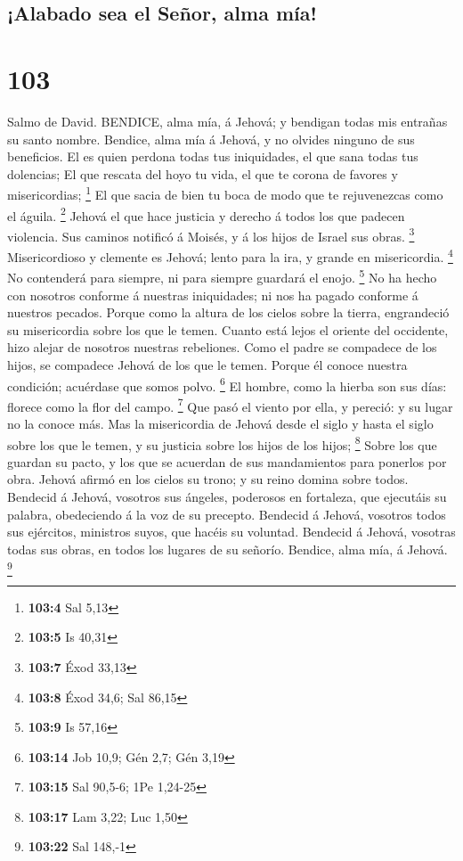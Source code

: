 \hypertarget{alabado-sea-el-seuxf1or-alma-muxeda}{%
\subsection{¡Alabado sea el Señor, alma
mía!}\label{alabado-sea-el-seuxf1or-alma-muxeda}}

\hypertarget{section-102}{%
\section{103}\label{section-102}}

 Salmo de David. BENDICE, alma mía, á Jehová; y bendigan
todas mis entrañas su santo nombre.  Bendice, alma mía á
Jehová, y no olvides ninguno de sus beneficios.  El es quien
perdona todas tus iniquidades, el que sana todas tus dolencias;
 El que rescata del hoyo tu vida, el que te corona de
favores y misericordias; \footnote{\textbf{103:4} Sal 5,13} 
El que sacia de bien tu boca de modo que te rejuvenezcas como el águila.
\footnote{\textbf{103:5} Is 40,31}  Jehová el que hace
justicia y derecho á todos los que padecen violencia.  Sus
caminos notificó á Moisés, y á los hijos de Israel sus obras.
\footnote{\textbf{103:7} Éxod 33,13}  Misericordioso y
clemente es Jehová; lento para la ira, y grande en misericordia.
\footnote{\textbf{103:8} Éxod 34,6; Sal 86,15}  No
contenderá para siempre, ni para siempre guardará el enojo. \footnote{\textbf{103:9}
  Is 57,16}  No ha hecho con nosotros conforme á nuestras
iniquidades; ni nos ha pagado conforme á nuestros pecados. 
Porque como la altura de los cielos sobre la tierra, engrandeció su
misericordia sobre los que le temen.  Cuanto está lejos el
oriente del occidente, hizo alejar de nosotros nuestras rebeliones.
 Como el padre se compadece de los hijos, se compadece
Jehová de los que le temen.  Porque él conoce nuestra
condición; acuérdase que somos polvo. \footnote{\textbf{103:14} Job
  10,9; Gén 2,7; Gén 3,19}  El hombre, como la hierba son
sus días: florece como la flor del campo. \footnote{\textbf{103:15} Sal
  90,5-6; 1Pe 1,24-25}  Que pasó el viento por ella, y
pereció: y su lugar no la conoce más.  Mas la misericordia
de Jehová desde el siglo y hasta el siglo sobre los que le temen, y su
justicia sobre los hijos de los hijos; \footnote{\textbf{103:17} Lam
  3,22; Luc 1,50}  Sobre los que guardan su pacto, y los
que se acuerdan de sus mandamientos para ponerlos por obra.
 Jehová afirmó en los cielos su trono; y su reino domina
sobre todos.  Bendecid á Jehová, vosotros sus ángeles,
poderosos en fortaleza, que ejecutáis su palabra, obedeciendo á la voz
de su precepto.  Bendecid á Jehová, vosotros todos sus
ejércitos, ministros suyos, que hacéis su voluntad. 
Bendecid á Jehová, vosotras todas sus obras, en todos los lugares de su
señorío. Bendice, alma mía, á Jehová. \footnote{\textbf{103:22} Sal
  148,-1}

